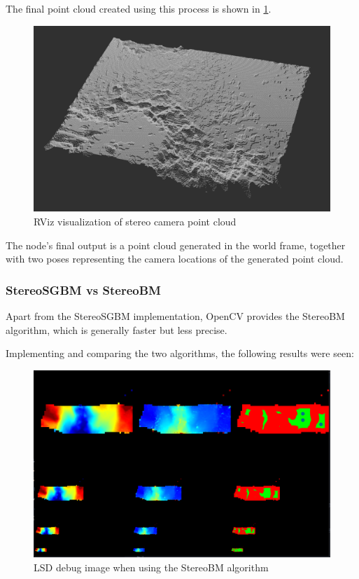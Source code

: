 The final point cloud created using this process is shown in \cref{fig:stereo_pc}.

\begin{figure}[h]
\centering
\includegraphics[scale=0.3]{images/stereo_camera_depth/stereo_pc.png}
\caption{RViz visualization of stereo camera point cloud}
\label{fig:stereo_pc}
\end{figure}

The node's final output is a point cloud generated in the world frame, together with two poses representing the camera locations of the generated point cloud.

\clearpage %

\subsubsection{StereoSGBM vs StereoBM}\label{subsec:bmvssgbm}

Apart from the StereoSGBM implementation, OpenCV provides the StereoBM algorithm, which is generally faster but less precise.

Implementing and comparing the two algorithms, the following results were seen:

\begin{figure}[h]
\centering
\includegraphics[scale=0.23]{images/stereo_camera_depth/stereoBM.png}
\caption{LSD debug image when using the StereoBM algorithm}
\label{fig:stereoBM}
\end{figure}

